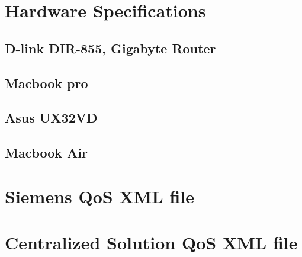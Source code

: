 
\chapter{Hardware Specifications}\label{appendix:HardwareSpecification}


\section{D-link DIR-855, Gigabyte Router}



\section{Macbook pro}\label{appendix:hardwareSpecification_pro}

\section{Asus UX32VD}\label{appendix:hardwareSpecification_asus}

\section{Macbook Air}\label{appendix:hardwareSpecification_air}


\chapter{Siemens QoS XML file}\label{appendix:siemensQosFile}


\chapter{Centralized Solution QoS XML file}\label{appendix:centralizedQosFile}
